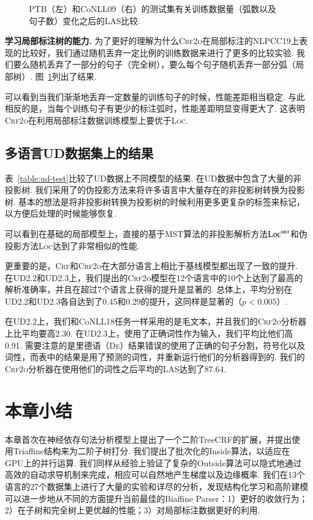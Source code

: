 \begin{figure}[tb!]
\begin{subfigure}[b]{0.4\textwidth}
  \end{subfigure}
  \caption{
    PTB（左）和CoNLL09（右）的测试集有关训练数据量（弧数以及句子数）变化之后的LAS比较.
  }
  \label{fig:part-gap}
\end{figure}

\noindent\textbf{学习局部标注树的能力.}
为了更好的理解为什么\textsc{Crf2o}在局部标注的NLPCC19上表现的比较好，我们通过随机丢弃一定比例的训练数据来进行了更多的比较实验.
我们要么随机丢弃了一部分的句子（完全树），要么每个句子随机丢弃一部分弧（局部树）.
图~\ref{fig:part-gap}列出了结果.

可以看到当我们渐渐地丢弃一定数量的训练句子的时候，性能差距相当稳定.
与此相反的是，当每个训练句子有更少的标注弧时，性能差距明显变得更大了.
这表明\textsc{Crf2o}在利用局部标注数据训练模型上要优于\textsc{Loc}.



\subsection{多语言UD数据集上的结果}

表~\ref{table:ud-test}比较了UD数据上不同模型的结果.
在UD数据中包含了大量的非投影树.
我们采用了\citet{nivre-nilsson-2005-pseudo}的伪投影方法来将许多语言中大量存在的非投影树转换为投影树.
基本的想法是将非投影树转换为投影树的时候利用更多更复杂的标签来标记，以方便后处理的时候能够恢复.

可以看到在基础的局部模型上，直接的基于MST算法的非投影解析方法$\textsc{Loc}^{\textsc{mst}}$和伪投影方法\textsc{Loc}达到了非常相似的性能.

更重要的是，\textsc{Crf}和\textsc{Crf2o}在大部分语言上相比于基线模型都出现了一致的提升.
在UD2.2和UD2.3上，我们提出的\textsc{Crf2o}模型在12个语言中的10个上达到了最高的解析准确率，并且在超过7个语言上获得的提升是显著的.
总体上，平均分别在UD2.2和UD2.3各自达到了0.45和0.29的提升，这同样是显著的（$p<0.005$）.

在UD2.2上，我们和CoNLL18任务一样采用的是毛文本，并且我们的\textsc{Crf2o}分析器上比\citet{ji-etal-2019-graph}平均要高2.30.
在UD2.3上，\citet{zhang-etal-2019-empirical}使用了正确词性作为输入，我们平均比他们高0.91.
需要注意的是\citet{ji-etal-2019-graph}里德语（\textsc{De}）结果错误的使用了正确的句子分割，符号化以及词性，而表中的结果是用了预测的词性，并重新运行他们的分析器得到的.
我们的\textsc{Crf2o}分析器在使用他们的词性之后平均的LAS达到了87.64.

\section{本章小结}
\label{sec:dep-conclusions}

本章首次在神经依存句法分析模型上提出了一个二阶TreeCRF的扩展，并提出使用Triaffine结构来为二阶子树打分.
我们提出了批次化的Inside算法，以适应在GPU上的并行运算.
我们同样从经验上验证了复杂的Outside算法可以隐式地通过高效的自动求导机制来完成，相应可以自然地产生梯度以及边缘概率.
我们在13个语言的27个数据集上进行了大量的实验和详尽的分析，发现结构化学习和高阶建模可以进一步地从不同的方面提升当前最佳的Biaffine Parser：1）更好的收敛行为；2）在子树和完全树上更优越的性能；3）对局部标注数据更好的利用.
